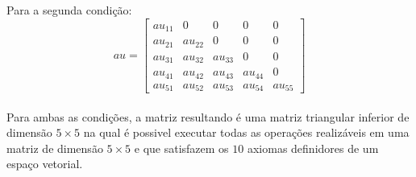 Para a segunda condição:
\\
\[
    au =
    \begin{bmatrix}
        au_{11} & 0       & 0       & 0       & 0       \\
        au_{21} & au_{22} & 0       & 0       & 0       \\
        au_{31} & au_{32} & au_{33} & 0       & 0       \\
        au_{41} & au_{42} & au_{43} & au_{44} & 0       \\
        au_{51} & au_{52} & au_{53} & au_{54} & au_{55}
    \end{bmatrix}
\]
\\

Para ambas as condições, a matriz resultando é uma matriz triangular inferior de dimensão $5\times 5$ na qual é possivel executar todas as operações realizáveis em uma matriz de dimensão $5\times 5$ e que satisfazem os $10$ axiomas definidores de um espaço vetorial.
\\